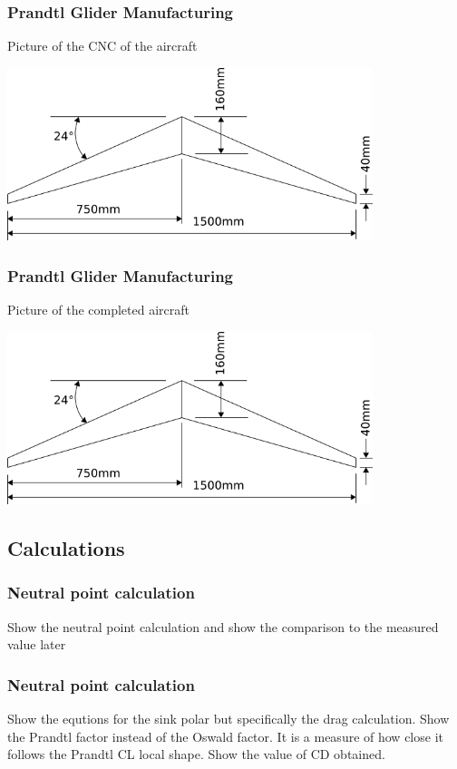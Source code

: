 \documentclass{beamer}
\begin{document}
\begin{frame}
\frametitle{Prandtl Glider Manufacturing}

Picture of the CNC of the aircraft

\includegraphics[width = 0.8\textwidth]{Pictures/P1Planform.png}

\end{frame}


\begin{frame}
\frametitle{Prandtl Glider Manufacturing}

Picture of the completed aircraft

\includegraphics[width = 0.8\textwidth]{Pictures/P1Planform.png}

\end{frame}





\subsection{Calculations} %

\begin{frame}
\frametitle{Neutral point calculation}
Show the neutral point calculation and show the comparison to the measured value later


\end{frame}


\begin{frame}
\frametitle{Neutral point calculation}
Show the equtions for the sink polar but specifically the drag calculation.  Show the Prandtl factor instead of the Oswald factor.  It is a measure of how close it follows the Prandtl CL local shape.
Show the value of CD obtained.


\end{frame}
\end{document}
